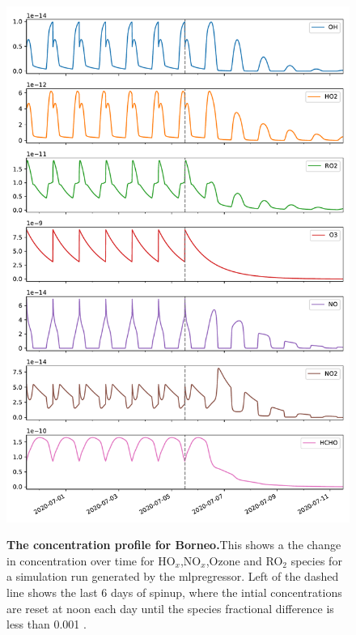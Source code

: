 \begin{figure}[H]
    \centering
\includegraphics[width=.9\textwidth]{figures_c3/mlpregressor/conc_borneo.pdf}
\label{fig:cborneo}
\caption{\textbf{The concentration profile for Borneo.}This shows a the change in concentration over time for HO$_x$,NO$_x$,Ozone and RO$_2$ species for a simulation run generated by the mlpregressor. Left of the dashed line shows the last 6 days of spinup, where the intial concentrations are reset at noon each day until the species fractional difference is less than 0.001 .}
\end{figure}

\newpage


